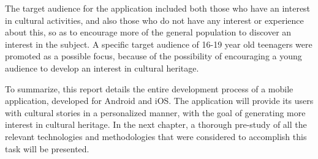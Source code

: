 The target audience for the application included both those who have an interest in cultural activities, and also those who do not have any interest or experience about this, so as to encourage more of the general population to discover an interest in the subject. A specific target audience of 16-19 year old teenagers were promoted as a possible focus, because of the possibility of encouraging a young audience to develop an interest in cultural heritage.

To summarize, this report details the entire development process of a mobile application, developed for Android and iOS. The application will provide its users with cultural stories in a personalized manner, with the goal of generating more interest in cultural heritage. In the next chapter, a thorough pre-study of all the relevant technologies and methodologies that were considered to accomplish this task will be presented.

\cleardoublepage